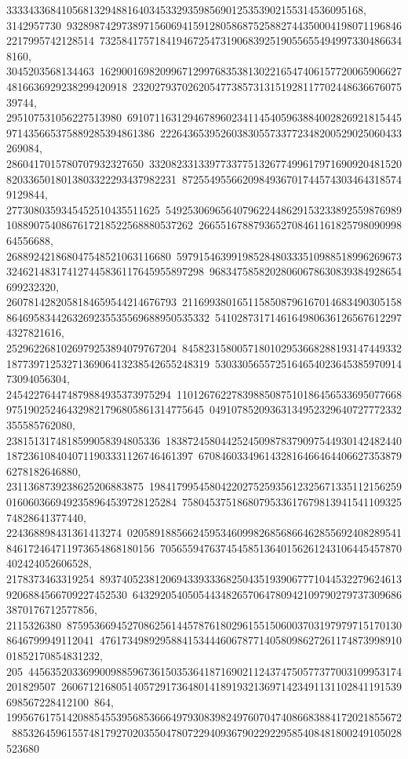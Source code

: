 {{{33334336841056813294881640345332935985690125353902155314536095168, 3142957730\
93289874297389715606941591280586875258827443500041980711968462217995742128514\
73258417571841946725473190683925190556554949973304866348160, 3045203568134463\
16290016982099671299768353813022165474061577200659066274816636929238299420918\
232027937026205477385731315192811770244863667607539744, 295107531056227513980\
69107116312946789602341145405963884002826921815445971435665375889285394861386\
22264365395260383055733772348200529025060433269084, 2860417015780707932327650\
33208233133977337751326774996179716909204815208203365018013803322293437982231\
87255495566209849367017445743034643185749129844, 2773080359345452510435511625\
54925306965640796224486291532338925598769891088907540867617218522568880537262\
266551678879365270846116182579809099864556688, 268892421868047548521063116680\
59791546399198528480333510988518996269673324621483174127445836117645955897298\
96834758582028060678630839384928654699232320, 2607814282058184659544214676793\
21169938016511585087961670146834903051588646958344263269235535569688950535332\
54102873171461649806361265676122974327821616, 2529622681026979253894079767204\
84582315800571801029536682881931474493321877397125327136906413238542655248319\
530330565572516465402364538597091473094056304, 245422764474879884935373975294\
11012676227839885087510186456533695077668975190252464329821796805861314775645\
04910785209363134952329640727772332355585762080, 2381513174818599058394805336\
18387245804425245098783790975449301424824401872361084040711903331126746461397\
67084603349614328164664644066273538796278182646880, 2311368739238625206883875\
19841799545804220275259356123256713351121562590160603669492358964539728125284\
758045375186807953361767981394154110932574828641377440, 224368898431361413274\
02058918856624595346099826856866462855692408289541846172464711973654868180156\
70565594763745458513640156261243106445457870402424052606528, 2178373463319254\
89374052381206943393336825043519390677710445322796246139206884566709227452530\
64329205405054434826570647809421097902797373096863870176712577856, 2115326380\
87595366945270862561445787618029615515060037031979797151701308646799949112041\
476173498929588415344460678771405809862726117487399891001852170854831232, 205\
44563520336990098859673615035364187169021124374750577377003109953174201829507\
26067121680514057291736480141891932136971423491131102841191539698567228412100\
864, 199567617514208854553956853666497930839824976070474086683884172021855672\
88532645961557481792702035504780722940936790229229585408481800249105028523680\
}}}
